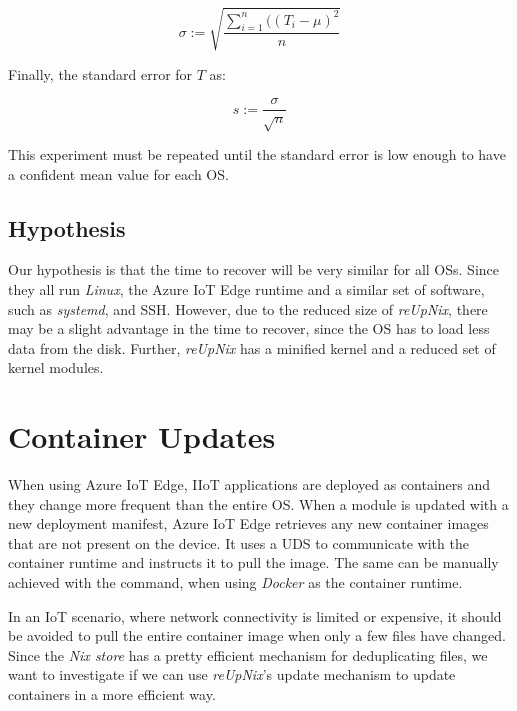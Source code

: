 \begin{equation}
   \sigma := \sqrt{\frac{\sum_{i=1}^{n}((T_i - \mu)^2}{n}}
\end{equation}

\noindent
Finally, the standard error for $T$ as:

\begin{equation}
    s := \frac{\sigma}{\sqrt{n}}
\end{equation}

\noindent
This experiment must be repeated until the standard error is low enough
to have a confident mean value for each \ac{OS}.

\subsection{Hypothesis}
Our hypothesis is that the time to recover will be very similar for all
\ac{OS}s. Since they all run \textit{Linux}, the Azure IoT Edge runtime and
a similar set of software, such as \textit{systemd}, and \ac{SSH}. However, due
to the reduced size of \textit{reUpNix}, there may be a slight advantage in the
time to recover, since the \ac{OS} has to load less data from the disk. Further,
\textit{reUpNix} has a minified kernel and a reduced set of kernel modules.

\section{Container Updates}
\label{sec:container-updates}
When using Azure IoT Edge, \ac{IIoT} applications are deployed as containers and
they change more frequent than the entire \ac{OS}. When a module is updated
with a new deployment manifest, Azure IoT Edge retrieves any new container
images that are not present on the device. It uses a \ac{UDS} to communicate
with the container runtime and instructs it to pull the image. The same can be
manually achieved with the  command, when using \textit{Docker}
as the container runtime.

In an \ac{IoT} scenario, where network connectivity is limited or expensive,
it should be avoided to pull the entire container image when only a few files have
changed. Since the \textit{Nix store} has a pretty efficient mechanism for
deduplicating files, we want to investigate if we can use \textit{reUpNix}'s
update mechanism to update containers in a more efficient way.

